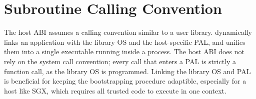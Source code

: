


%
%
%



\section{Subroutine Calling Convention}



The host ABI assumes a calling convention similar to
a user library.
\graphene{} dynamically links an application with the library OS and the host-specific PAL,
and unifies them into a single executable running inside a process.
The host ABI does not
rely on the system call convention;
every call that enters a PAL is strictly a function call,
as the library OS is programmed.
Linking the library OS and PAL is beneficial for keeping the bootstrapping procedure adaptible,
especially for a host like SGX,
which requires all trusted code to execute in one context.
 


